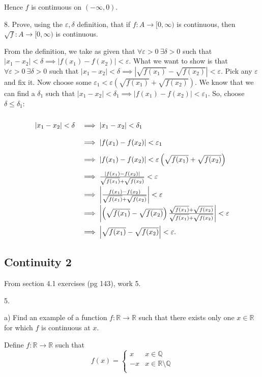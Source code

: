 \documentclass[11pt]{article}
\newcommand{\Q}{\mathbb{Q}}
\newcommand{\R}{\mathbb{R}}
\begin{document}
Hence $f$ is continuous on $(-\infty,0)$.

8. Prove, using the $\varepsilon,\delta$ definition, that if
$f:A\to[0,\infty)$ is continuous, then $\sqrt{f}:A\to[0,\infty)$ is continuous.

From the definition, we take as given that
$\forall\varepsilon>0\ \exists\delta>0$ such that
$|x_1-x_2|<\delta\implies|f(x_1)-f(x_2)|<\varepsilon$. What we want to show
is that 
$\forall\varepsilon>0\ \exists\delta>0$ such that
$|x_1-x_2|<\delta\implies\left|\sqrt{f(x_1)}-\sqrt{f(x_2)}\right|<\varepsilon$.
Pick any $\varepsilon$ and fix it. Now choose some
$\varepsilon_1<\varepsilon\left(\sqrt{f(x_1)}+\sqrt{f(x_2)}\right)$.
We know that we can find a $\delta_1$ such that $|x_1-x_2|<\delta_1\implies
|f(x_1)-f(x_2)|<\varepsilon_1$. So, choose $\delta \leq \delta_1$:

\[
\def\arraystretch{2}
\begin{array}{rl}
|x_1-x_2|<\delta &\implies |x_1-x_2|<\delta_1 \\
&\implies |f(x_1)-f(x_2)|<\varepsilon_1 \\
&\implies |f(x_1)-f(x_2)|<\varepsilon\left(\sqrt{f(x_1)}+\sqrt{f(x_2)}\right) \\
&\implies \frac{|f(x_1)-f(x_2)|}{\sqrt{f(x_1)}+\sqrt{f(x_2)}}<\varepsilon \\
&\implies \left|\frac{f(x_1)-f(x_2)}{\sqrt{f(x_1)}+\sqrt{f(x_2)}}\right|<\varepsilon \\
&\implies \left|\left(\sqrt{f(x_1)}-\sqrt{f(x_2)}\right)
\frac{\sqrt{f(x_1)}+\sqrt{f(x_2)}}{\sqrt{f(x_1)}+\sqrt{f(x_2)}}
\right|<\varepsilon \\
&\implies \left|\sqrt{f(x_1)}-\sqrt{f(x_2)}\right|<\varepsilon.
\end{array}
\]

\subsection*{Continuity 2}

From section 4.1 exercises (pg 143), work 5.

5.

a) Find an example of a function $f:\R\to\R$ such that there exists only one
$x\in\R$ for which $f$ is continuous at $x$.

Define $f:\R\to\R$ such that
\[
f(x)=\begin{cases}
    x & x\in\Q \\
    -x & x\in\R\setminus\Q\\
\end{cases}
\]
\end{document}
